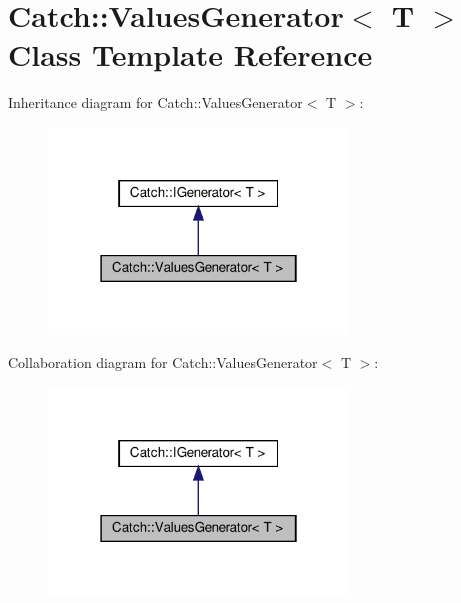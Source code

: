 \hypertarget{classCatch_1_1ValuesGenerator}{}\section{Catch\+:\+:Values\+Generator$<$ T $>$ Class Template Reference}
\label{classCatch_1_1ValuesGenerator}


Inheritance diagram for Catch\+:\+:Values\+Generator$<$ T $>$\+:\nopagebreak
\begin{figure}[H]
\begin{center}
\leavevmode
\includegraphics[width=226pt]{classCatch_1_1ValuesGenerator__inherit__graph}
\end{center}
\end{figure}


Collaboration diagram for Catch\+:\+:Values\+Generator$<$ T $>$\+:\nopagebreak
\begin{figure}[H]
\begin{center}
\leavevmode
\includegraphics[width=226pt]{classCatch_1_1ValuesGenerator__coll__graph}
\end{center}
\end{figure}
